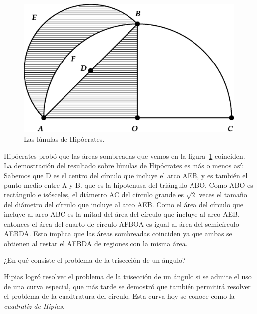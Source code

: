 \begin{figure}
   \centering
   \includegraphics[scale=0.3]{images/lunula}
   \caption{Las lúnulas de Hipócrates.}
   \label{fig:lunula}
\end{figure}

Hipócrates probó que las áreas
sombreadas que vemos en la figura~\ref{fig:lunula} coinciden. La demostración del
resultado sobre lúnulas de Hipócrates es más o menos así: Sabemos que D es el
centro del círculo que incluye el arco AEB, y es también el punto medio entre A
y B, que es la hipotenusa del triángulo ABO. Como ABO es rectángulo e
isósceles, el diámetro AC del círculo grande es $\sqrt{2}$ veces el tamaño del
diámetro del círculo que incluye al arco AEB. Como el área del círculo que
incluye al arco ABC es la mitad del área del círculo que incluye al arco AEB,
entonces el área del cuarto de círculo AFBOA es igual al área del semicírculo
AEBDA. Esto implica que las áreas sombreadas coinciden ya que ambas se obtienen
al restar el AFBDA de regiones con la misma área. 


\begin{exercise}
	¿En qué consiste el problema de la trisección de un ángulo?
\end{exercise}

Hipias logró resolver el problema de la trisección de un ángulo si se admite el
uso de una curva especial, que más tarde se demostró que también permitirá
resolver el problema de la cuadtratura del círculo. Esta curva hoy se conoce
como la \emph{cuadratiz de Hipias}.

